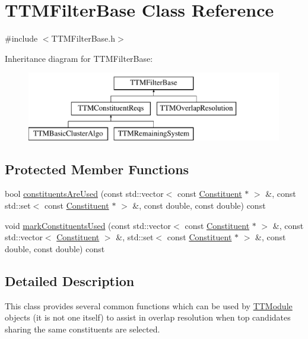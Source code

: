 \hypertarget{classTTMFilterBase}{\section{T\-T\-M\-Filter\-Base Class Reference}
\label{classTTMFilterBase}
}


{\ttfamily \#include $<$T\-T\-M\-Filter\-Base.\-h$>$}

Inheritance diagram for T\-T\-M\-Filter\-Base\-:\begin{figure}[H]
\begin{center}
\leavevmode
\includegraphics[height=3.000000cm]{classTTMFilterBase}
\end{center}
\end{figure}
\subsection*{Protected Member Functions}
\begin{DoxyCompactItemize}
\item 
bool \hyperlink{classTTMFilterBase_a98fd6161e5b20134fb1b963c182ba630}{constituents\-Are\-Used} (const std\-::vector$<$ const \hyperlink{classConstituent}{Constituent} $\ast$ $>$ \&, const std\-::set$<$ const \hyperlink{classConstituent}{Constituent} $\ast$ $>$ \&, const double, const double) const 
\item 
void \hyperlink{classTTMFilterBase_aaddc805db839d120d018855e4ba12c67}{mark\-Constituents\-Used} (const std\-::vector$<$ const \hyperlink{classConstituent}{Constituent} $\ast$ $>$ \&, const std\-::vector$<$ \hyperlink{classConstituent}{Constituent} $>$ \&, std\-::set$<$ const \hyperlink{classConstituent}{Constituent} $\ast$ $>$ \&, const double, const double) const 
\end{DoxyCompactItemize}


\subsection{Detailed Description}
This class provides several common functions which can be used by \hyperlink{classTTModule}{T\-T\-Module} objects (it is not one itself) to assist in overlap resolution when top candidates sharing the same constituents are selected. 

